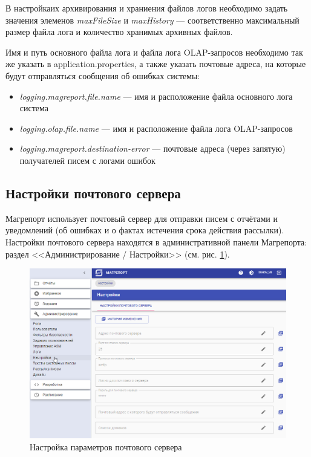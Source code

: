 \documentclass[../user-manual.tex]{subfiles}
\begin{document}
	В настройкаих архивирования и храниения файлов логов необходимо задать значения элеменов \textit{maxFileSize} и \textit{maxHistory} --- соответственно максимальный размер файла лога и количество хранимых архивных файлов.

	Имя и путь основного файла лога и файла лога OLAP-запросов необходимо так же указать в application.properties, а также указать почтовые адреса, на которые будут отправляться сообщения об ошибках системы:

	\begin{itemize}
		\item  \textit{logging.magreport.file.name} --- имя и расположение файла основного лога система
		
		\item  \textit{logging.olap.file.name} --- имя и расположение файла лога OLAP-запросов
		
		\item  \textit{logging.magreport.destination-error} --- почтовые адреса (через запятую) получателей писем с логами ошибок
		
	\end{itemize}	

	
	\subsection{Настройки почтового сервера} \label{subsection:email-settings}
	
	Магрепорт использует почтовый сервер для отправки писем с отчётами и уведомлений (об ошибках и о фактах истечения срока действия рассылки). Настройки почтового сервера находятся в административной панели Магрепорта: раздел <<Администрирование / Настройки>> (см. рис. \ref{fig:email-settings}).
	
	\begin{figure}[h]
		\centering
		\includegraphics[width=\graphicswidth]{img/01-email-settings.png}
		\caption{Настройка параметров почтового сервера}
		\label{fig:email-settings}
	\end{figure}
\end{document}
